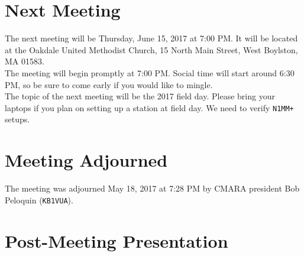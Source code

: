 \documentclass[10pt,letterpaper]{article}
\begin{document}
\section{Next Meeting}
The next meeting will be Thursday, June 15, 2017 at 7:00 PM. It will be located at the Oakdale United Methodist Church, 15 North Main Street, West Boylston, MA 01583.\\

\noindent
The meeting will begin promptly at 7:00 PM. Social time will start around 6:30 PM, so be sure to come early if you would like to mingle.\\

\noindent
The topic of the next meeting will be the 2017 field day. Please bring your laptops if you plan on setting up a station at field day. We need to verify \texttt{N1MM+} setups.

\section{Meeting Adjourned}
The meeting was adjourned May 18, 2017 at 7:28 PM by CMARA president Bob Peloquin (\texttt{KB1VUA}).

\section{Post-Meeting Presentation}
\end{document}
